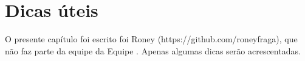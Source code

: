 \chapter{Dicas úteis}\label{cap_dicas}

O presente capítulo foi escrito foi Roney (https://github.com/roneyfraga), que não faz parte da equipe da Equipe \abnTeX . Apenas algumas dicas serão acrescentadas.


